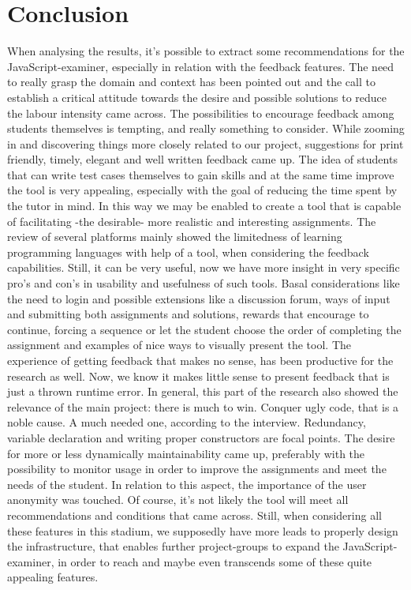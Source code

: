 \documentclass{article}
\begin{document}
\section{Conclusion} 
When analysing the results, it's possible to extract some recommendations for 
the JavaScript-examiner, especially in relation with the feedback features. The
need to really grasp the domain and context has been pointed out and the call to
establish a critical attitude towards the desire and possible solutions
to reduce the labour intensity came across. The possibilities to encourage 
feedback among students themselves is tempting, and really something to consider.
\newline While zooming in and discovering things more closely related to our 
project, suggestions for print friendly, timely, elegant and well written 
feedback came up. The idea of students that can write test cases themselves to 
gain skills and at the same time improve the tool is very appealing, especially 
with the goal of reducing the time spent by the tutor in mind. In this way we 
may be enabled to create 
a tool that is capable of facilitating -the desirable- more realistic and 
interesting assignments. The review of several platforms mainly showed the 
limitedness of learning programming languages with help of a tool, when 
considering the feedback capabilities. Still, it can be very useful, now we have 
more insight in very specific pro's and con's in usability and usefulness of such 
tools. Basal considerations like the need to login and possible extensions like a 
discussion forum, ways of input and submitting both assignments and solutions, 
rewards that encourage to continue, forcing a sequence or let the student choose 
the order of completing the assignment and examples of nice ways to visually 
present the tool. 
The experience of getting feedback that makes no sense, has been productive for the 
research as well. Now, we know it makes little sense to present feedback that 
is just a thrown runtime error. In general, this part of the research also showed the 
relevance of the main project: there is much to win. \newline
Conquer ugly code, that is a noble cause. A much needed one, according to the
interview. Redundancy, variable declaration and writing proper constructors are
focal points. The desire for more or less dynamically maintainability came
up, preferably with the possibility to monitor usage in order to improve the 
assignments and meet the needs of the student. In relation to this aspect, the 
importance of the user anonymity was touched. \newline
Of course, it's not likely the tool will meet all recommendations and 
conditions that came across.
Still, when considering all these features in this stadium, we supposedly have 
more leads to properly design the infrastructure, that enables further 
project-groups to expand the JavaScript-examiner, in order to reach and maybe
even transcends some of these quite appealing features. 



\end{document}
